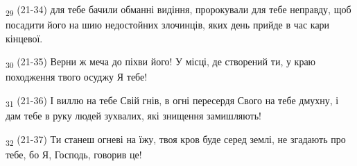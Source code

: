 \begin{tcolorbox}
\textsubscript{29} (21-34) для тебе бачили обманні видіння, пророкували для тебе неправду, щоб посадити його на шию недостойних злочинців, яких день прийде в час кари кінцевої.
\end{tcolorbox}
\begin{tcolorbox}
\textsubscript{30} (21-35) Верни ж меча до піхви його! У місці, де створений ти, у краю походження твого осуджу Я тебе!
\end{tcolorbox}
\begin{tcolorbox}
\textsubscript{31} (21-36) І виллю на тебе Свій гнів, в огні пересердя Свого на тебе дмухну, і дам тебе в руку людей зухвалих, які знищення замишляють!
\end{tcolorbox}
\begin{tcolorbox}
\textsubscript{32} (21-37) Ти станеш огневі на їжу, твоя кров буде серед землі, не згадають про тебе, бо Я, Господь, говорив це!
\end{tcolorbox}
